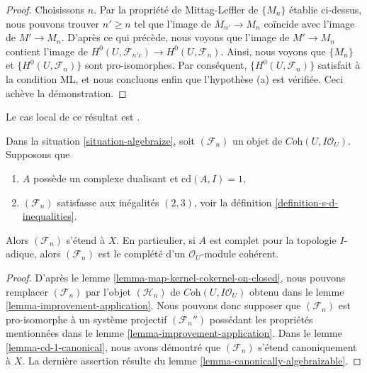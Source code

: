 \begin{proof}
\medskip\noindent
Choisissons $n$. Par la propriété de Mittag-Leffler de $\{M_n\}$ établie ci-dessus,
nous pouvons trouver $n' \geq n$ tel que l'image de $M_{n'} \to M_n$
coïncide avec l'image de $M' \to M_n$. D'après ce qui précède, nous voyons que
l'image de $M' \to M_n$ contient l'image de
$H^0(U, \mathcal{F}_{n'c}) \to H^0(U, \mathcal{F}_n)$.
Ainsi, nous voyons que $\{M_n\}$ et $\{H^0(U, \mathcal{F}_n)\}$
sont pro-isomorphes. Par conséquent, $\{H^0(U, \mathcal{F}_n)\}$
satisfait à la condition ML, et nous concluons enfin que l'hypothèse (a) est vérifiée.
Ceci achève la démonstration.
\end{proof}

\begin{proposition}
\label{proposition-cd-1}
\begin{reference}
Le cas local de ce résultat est \cite[IV Corollaire 2.9]{MRaynaud-book}.
\end{reference}
Dans la situation \ref{situation-algebraize}, soit $(\mathcal{F}_n)$
un objet de $\textit{Coh}(U, I\mathcal{O}_U)$. Supposons que
\begin{enumerate}
\item $A$ possède un complexe dualisant et $\text{cd}(A, I) = 1$,
\item $(\mathcal{F}_n)$ satisfasse aux inégalités $(2, 3)$, voir la
définition \ref{definition-s-d-inequalities}.
\end{enumerate}
Alors $(\mathcal{F}_n)$ s'étend à $X$. En particulier, si $A$ est
complet pour la topologie $I$-adique, alors $(\mathcal{F}_n)$ est le complété
d'un $\mathcal{O}_U$-module cohérent.
\end{proposition}

\begin{proof}
D'après le lemme \ref{lemma-map-kernel-cokernel-on-closed},
nous pouvons remplacer $(\mathcal{F}_n)$ par l'objet $(\mathcal{H}_n)$
de $\textit{Coh}(U, I\mathcal{O}_U)$ obtenu dans le
lemme \ref{lemma-improvement-application}.
Nous pouvons donc supposer que $(\mathcal{F}_n)$ est pro-isomorphe
à un système projectif $(\mathcal{F}_n'')$ possédant les propriétés
mentionnées dans le lemme \ref{lemma-improvement-application}.
Dans le lemme \ref{lemma-cd-1-canonical}, nous avons démontré que
$(\mathcal{F}_n)$ s'étend canoniquement à $X$.
La dernière assertion résulte du lemme \ref{lemma-canonically-algebraizable}.
\end{proof}


